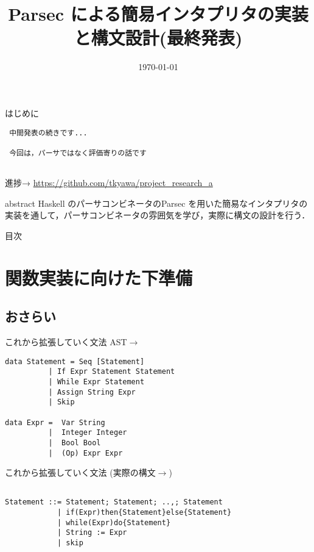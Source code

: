 \documentclass[uplatex,dvipdfmx,ja=standard]{beamer}
\begin{document}
%
%
\title[Presentation]{Parsec による簡易インタプリタの実装と構文設計(最終発表)} 
\date{\today}

\begin{frame}
\titlepage 
\end{frame}

\begin{frame}[fragile]{はじめに}
 \begin{verbatim}
 中間発表の続きです...

 今回は，パーサではなく評価寄りの話です
 
 \end{verbatim}

 進捗→
 \url{https://github.com/tkyawa/project_research_a}

\end{frame}

\begin{frame}{abstract}
Haskell のパーサコンビネータのParsec を用いた簡易なインタプリタの実装を通して，パーサコンビネータの雰囲気を学び，実際に構文の設計を行う．
\end{frame}

\begin{frame}{目次}
    \tableofcontents
\end{frame}

\setcounter{section}{3}

\section{関数実装に向けた下準備}
\subsection{おさらい}

\begin{frame}[fragile]{これから拡張していく文法}
AST$\to$ 

    \begin{verbatim}
data Statement = Seq [Statement]
          | If Expr Statement Statement
          | While Expr Statement  
          | Assign String Expr
          | Skip

data Expr =  Var String   
          |  Integer Integer 
          |  Bool Bool
          |  (Op) Expr Expr
    \end{verbatim}
\end{frame}

\begin{frame}[fragile]{これから拡張していく文法}
(実際の構文$\to$)
 
\begin{verbatim}

Statement ::= Statement; Statement; ..,; Statement
            | if(Expr)then{Statement}else{Statement}
            | while(Expr)do{Statement}
            | String := Expr
            | skip
    \end{verbatim}
\end{frame}
\end{document}

